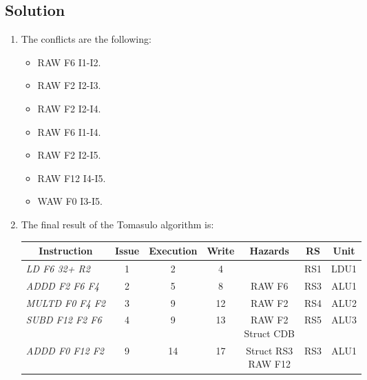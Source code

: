 \subsection*{Solution}
\begin{enumerate}
    \item The conflicts are the following: 
        \begin{itemize}
            \item RAW F6 I1-I2.
            \item RAW F2 I2-I3.
            \item RAW F2 I2-I4.
            \item RAW F6 I1-I4.
            \item RAW F2 I2-I5.
            \item RAW F12 I4-I5.
            \item WAW F0 I3-I5.
        \end{itemize}
    \item The final result of the Tomasulo algorithm is: 
        \begin{table}[H]
            \centering
            \begin{tabular}{l|cccc|cc}
            \multicolumn{1}{c|}{\textbf{Instruction}} & \textbf{Issue} & \textbf{Execution} & \textbf{Write} & \textbf{Hazards}                 & \textbf{RS} & \textbf{Unit} \\ \hline
            \textit{LD F6 32+ R2}                     & 1              & 2                  & 4              &                                  & RS1         & LDU1          \\
            \textit{ADDD F2 F6 F4}                    & 2              & 5                  & 8              & RAW F6                           & RS3         & ALU1          \\
            \textit{MULTD F0 F4 F2}                   & 3              & 9                  & 12             & RAW F2                           & RS4         & ALU2          \\
            \textit{SUBD F12 F2 F6}                   & 4              & 9                  & 13             & \makecell{RAW F2 \\ Struct CDB}  & RS5         & ALU3          \\
            \textit{ADDD F0 F12 F2}                   & 9              & 14                 & 17             & \makecell{Struct RS3 \\ RAW F12} & RS3         & ALU1         
            \end{tabular}
        \end{table}
\end{enumerate}